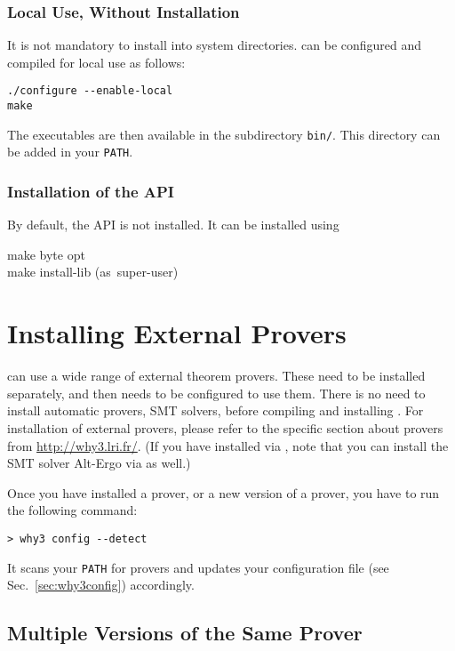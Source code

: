 \subsubsection{Local Use, Without Installation}

It is not mandatory to install \why into system directories.
\why can be configured and compiled for local use as follows:
\begin{verbatim}
./configure --enable-local
make
\end{verbatim}
The \why executables are then available in the subdirectory
\texttt{bin/}. This directory can be added in your \texttt{PATH}.

\subsubsection{Installation of the \why API}
\label{sec:installlib}

By default, the \why API is not installed. It can be installed using
\begin{flushleft}\ttfamily
make byte opt \\
make install-lib \mbox{\rmfamily (as super-user)}
\end{flushleft}

\section{Installing External Provers}
\label{provers}

\why can use a wide range of external theorem provers. These need to
be installed separately, and then \why needs to be configured to use
them. There is no need to install automatic provers, \eg SMT solvers,
before compiling and installing \why.
For installation of external provers, please refer to the specific
section about provers from \url{http://why3.lri.fr/}.
(If you have installed \why via \opam, note that you can install the
SMT solver Alt-Ergo via \opam as well.)

Once you have installed a prover, or a new version of a prover, you
have to run the following command:
\begin{verbatim}
> why3 config --detect
\end{verbatim}
It scans your \texttt{PATH} for provers and updates your configuration
file (see Sec.~\ref{sec:why3config}) accordingly.

\subsection{Multiple Versions of the Same Prover}

